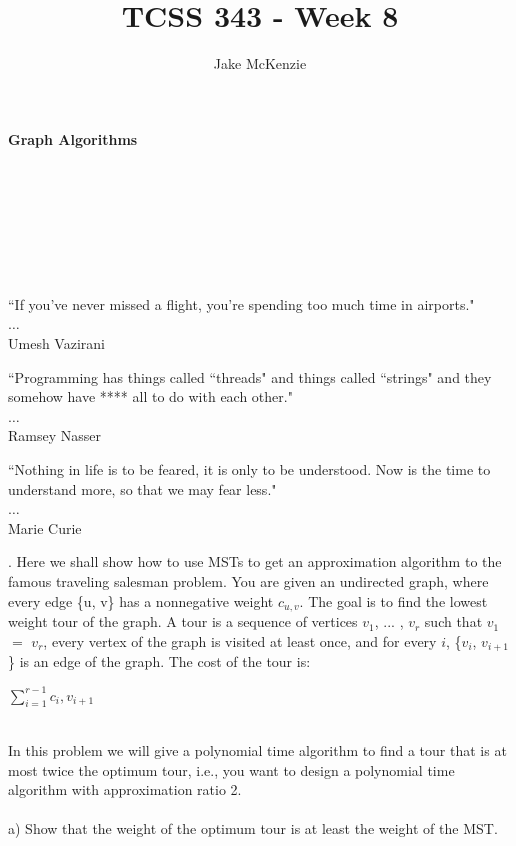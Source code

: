 \documentclass[12pt]{article}
\begin{document}
\lstset{language = Java}
\title{TCSS 343 - Week 8}
\author{Jake McKenzie}
\maketitle
\noindent\centerline{\textbf{Graph Algorithms}}\\\\\\\\\\\\
\begin{center}
    ``If you've never missed a flight, you’re spending too much time in airports." \\$\dots$\\ Umesh Vazirani
\end{center}
\begin{center}
    ``Programming has things called ``threads" and things called ``strings" and they somehow have **** all to do with each other." \\$\dots$\\ Ramsey Nasser
\end{center}
\begin{center}
    ``Nothing in life is to be feared, it is only to be understood. Now is the time to understand more, 
    so that we may fear less." \\$\dots$\\ Marie Curie
\end{center}
\newpage
{}.  Here we shall show how to use MSTs to get an approximation algorithm to the famous 
traveling salesman problem. You are given an undirected graph, where every edge \{u, v\} has a 
nonnegative weight $c_{u,v}$. The goal is to find the lowest weight tour of the graph. A tour is a
sequence of vertices $v_1$, ... , $v_r$ such that $v_1$ $=$ $v_r$, every vertex of the graph is visited at least
once, and for every $i$, \{$v_i$, $v_{i+1}$\} is an edge of the graph. The cost of the tour is:\\
\centerline{$\sum\limits_{i=1}^{r-1}c_i,v_{i+1}$}
\\
In this problem we will give a polynomial time algorithm to find a tour that is at most twice 
the optimum tour, i.e., you want to design a polynomial time algorithm 
with approximation ratio 2. 
\\\\
a) Show that the weight of the optimum tour is at least the 
weight of the MST.\\
\newpage
\end{document}
